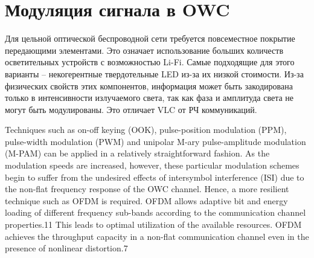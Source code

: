 \chapter{Модуляция сигнала в OWC}

Для цельной оптической беспроводной сети требуется повсеместное покрытие передающими элементами. Это означает использование больших количеств осветительных устройств с возможностью Li-Fi. Самые подходящие для этого варианты \--- некогерентные твердотельные LED из-за их низкой стоимости. Из-за физических свойств этих компонентов, информация может быть закодирована только в интенсивности излучаемого света, так как фаза и амплитуда света не могут быть модулированы. Это отличает VLC от РЧ коммуникаций.



Techniques such as on-off keying (OOK), pulse-position modulation
(PPM), pulse-width modulation (PWM) and unipolar M-ary pulse-amplitude modulation (M-PAM) can be
applied in a relatively straightforward fashion. As the modulation speeds are increased, however, these particular
modulation schemes begin to suffer from the undesired effects of intersymbol interference (ISI) due to the non-flat
frequency response of the OWC channel. Hence, a more resilient technique such as OFDM is required. OFDM
allows adaptive bit and energy loading of different frequency sub-bands according to the communication channel
properties.11 This leads to optimal utilization of the available resources. OFDM achieves the throughput capacity
in a non-flat communication channel even in the presence of nonlinear distortion.7